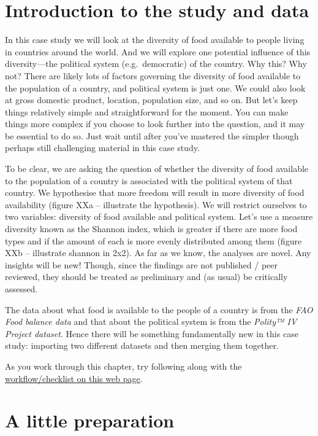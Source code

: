 \documentclass[]{book}
\begin{document}
\hypertarget{introduction-to-the-study-and-data}{%
\section{Introduction to the study and data}\label{introduction-to-the-study-and-data}}

In this case study we will look at the diversity of food available to people living in countries around the world. And we will explore one potential influence of this diversity---the political system (e.g.~democratic) of the country. Why this? Why not? There are likely lots of factors governing the diversity of food available to the population of a country, and political system is just one. We could also look at gross domestic product, location, population size, and so on. But let's keep things relatively simple and straightforward for the moment. You can make things more complex if you choose to look further into the question, and it may be essential to do so. Just wait until after you've mastered the simpler though perhaps still challenging material in this case study.

To be clear, we are asking the question of whether the diversity of food available to the population of a country is associated with the political system of that country. We hypothesise that more freedom will result in more diversity of food availability (figure XXa -- illustrate the hypothesis). We will restrict ourselves to two variables: diversity of food available and political system. Let's use a measure diversity known as the Shannon index, which is greater if there are more food types and if the amount of each is more evenly distributed among them (figure XXb -- illustrate shannon in 2x2). As far as we know, the analyses are novel. Any insights will be new! Though, since the findings are not published / peer reviewed, they should be treated as preliminary and (as usual) be critically assessed.

The data about what food is available to the people of a country is from the \emph{FAO Food balance data} and that about the political system is from the \emph{Polity™ IV Project dataset}. Hence there will be something fundamentally new in this case study: importing two different datasets and then merging them together.

As you work through this chapter, try following along with the \href{http://r4all.org/posts/workflow-checklist-for-data-analysis/}{workflow/checklist on this web page}.

\hypertarget{a-little-preparation}{%
\section{A little preparation}\label{a-little-preparation}}
\end{document}
